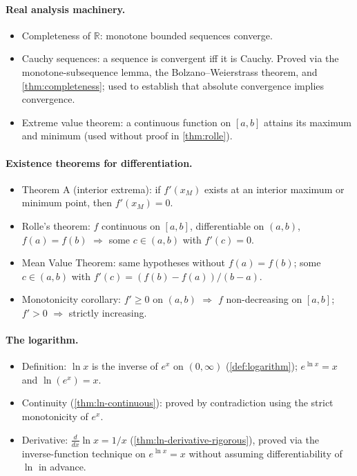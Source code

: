 \paragraph{Real analysis machinery.}
\begin{itemize}
    \item Completeness of \(\mathbb{R}\): monotone bounded sequences converge.
    \item Cauchy sequences: a sequence is convergent iff it is Cauchy. Proved via the monotone-subsequence lemma, the Bolzano--Weierstrass theorem, and \cref{thm:completeness}; used to establish that absolute convergence implies convergence.
    \item Extreme value theorem: a continuous function on \([a, b]\) attains its maximum and minimum (used without proof in \cref{thm:rolle}).
\end{itemize}

\paragraph{Existence theorems for differentiation.}
\begin{itemize}
    \item Theorem A (interior extrema): if \(f'(x_{M})\) exists at an interior maximum or minimum point, then \(f'(x_{M}) = 0\).
    \item Rolle's theorem: \(f\) continuous on \([a, b]\), differentiable on \((a, b)\), \(f(a) = f(b)\) \(\Rightarrow\) some \(c \in (a, b)\) with \(f'(c) = 0\).
    \item Mean Value Theorem: same hypotheses without \(f(a) = f(b)\); some \(c \in (a, b)\) with \(f'(c) = (f(b) - f(a))/(b - a)\).
    \item Monotonicity corollary: \(f' \geq 0\) on \((a, b)\) \(\Rightarrow\) \(f\) non-decreasing on \([a, b]\); \(f' > 0\) \(\Rightarrow\) strictly increasing.
\end{itemize}

\paragraph{The logarithm.}
\begin{itemize}
    \item Definition: \(\ln x\) is the inverse of \(e^{x}\) on \((0, \infty)\) (\cref{def:logarithm}); \(e^{\ln x} = x\) and \(\ln(e^{x}) = x\).
    \item Continuity (\cref{thm:ln-continuous}): proved by contradiction using the strict monotonicity of \(e^{x}\).
    \item Derivative: \(\frac{d}{dx} \ln x = 1/x\) (\cref{thm:ln-derivative-rigorous}), proved via the inverse-function technique on \(e^{\ln x} = x\) without assuming differentiability of \(\ln\) in advance.
\end{itemize}

